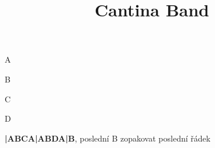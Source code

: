 \documentclass[timestamp]{jazzgrid}
\title{Cantina Band}
\begin{document}
\maketitle
\begin{musicsection}{A}
\barline
	{}
	{\barfour{}{}{}{}{}}
	{}
	{}
\barline
	{}
	{\barfour{}{}{}{}{}}
	{}
	{}
\barline
	{}
	{\barfour{}{}{}{}{}}
	{}
	{}
\barline
	{}
	{}
	{}
	{}
\end{musicsection}

\begin{musicsection}{B}
\barline
	{}
	{\barfour{}{}{}{}{}}
	{\barfour{}{}{}{}{}}
	{\barfour{}{}{}{}{}}
\barline
	{}
	{\barfour{}{}{}{}{}}
	{\barfour{}{}{}{}{}}
	{}
\barline
	{}
	{\barfour{}{}{}{}{}}
	{\barfour{}{}{}{}{}}
	{\barfour{}{}{}{}{}}
\barline
	{}
	{}
	{}
	{}
\end{musicsection}
\begin{musicsection}{C}
\barline
	{}
	{\barfour{}{}{}{}{}}
	{\barfour{}{}{}{}{}}
	{\barfour{}{}{}{}{}}
\barline
	{}
	{\barfour{}{}{}{}{}}
	{\barfour{}{}{}{}{}}
	{\barfour{}{}{}{}{}}
\end{musicsection}

\begin{musicsection}{D}
\barline
	{}
	{\barfour{}{}{}{}{}}
	{}
	{\barfour{}{}{}{}{}}
\barline
	{}
	{\barfour{}{}{}{}{}}
	{}
	{\barfour{}{}{}{}{}}
\barline
	{}
	{}
	{}
	{}
\barline
	{}
	{}
	{}
	{}
\end{musicsection}
\tiny
\textbf{|ABCA|ABDA|B}, poslední B zopakovat poslední řádek
\end{document}
